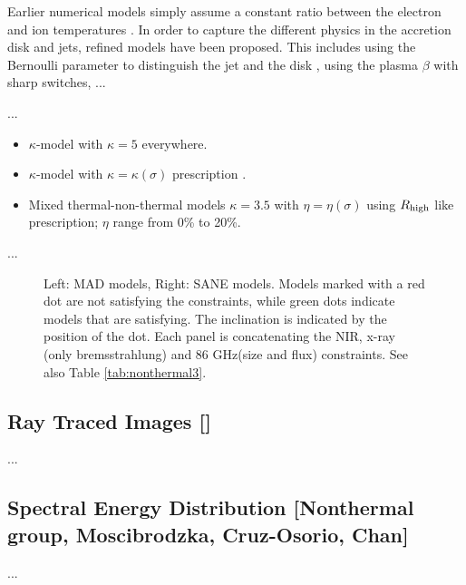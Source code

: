 \documentclass[twocolumn,tighten,dvipsnames,linenumbers]{aastex63}
\begin{document}
Earlier numerical models simply assume a constant ratio between the
electron and ion temperatures \citep{...}.
In order to capture the different physics in the accretion disk and
jets, refined models have been proposed.
This includes using the Bernoulli parameter to distinguish the jet and
the disk \citep{2014A&A...570A...7M}, using the plasma $\beta$
\citep{2015ApJ...799....1C, 2015ApJ...812..103C} with sharp switches, ...

...

\begin{itemize}
\item $\kappa$-model with $\kappa = 5$ everywhere.
\item $\kappa$-model with $\kappa = \kappa(\sigma)$ prescription
  \citep{2016ApJ...826...77B}.
\item Mixed thermal-non-thermal models $\kappa = 3.5$ with $\eta =
  \eta(\sigma)$ using ${R_\mathrm{high}}$ like prescription; $\eta$ range from 0\%
  to 20\%.
\end{itemize}

...

\begin{figure}
  \caption{Left: MAD models, Right: SANE models.  Models marked with a red dot are not satisfying the constraints, while green dots indicate models that are satisfying.  The inclination is indicated by the position of the dot. Each panel is concatenating  the NIR, x-ray (only bremsstrahlung) and 86 GHz(size and flux) constraints. See also Table \ref{tab:nonthermal3}. }
  \label{fig:nonthermal3}
\end{figure}

\subsection{Ray Traced Images
  []}
\label{sec:images}

...

\subsection{Spectral Energy Distribution
  [Nonthermal group, Moscibrodzka, Cruz-Osorio, Chan]}
\label{sec:SED}

...

\end{document}
